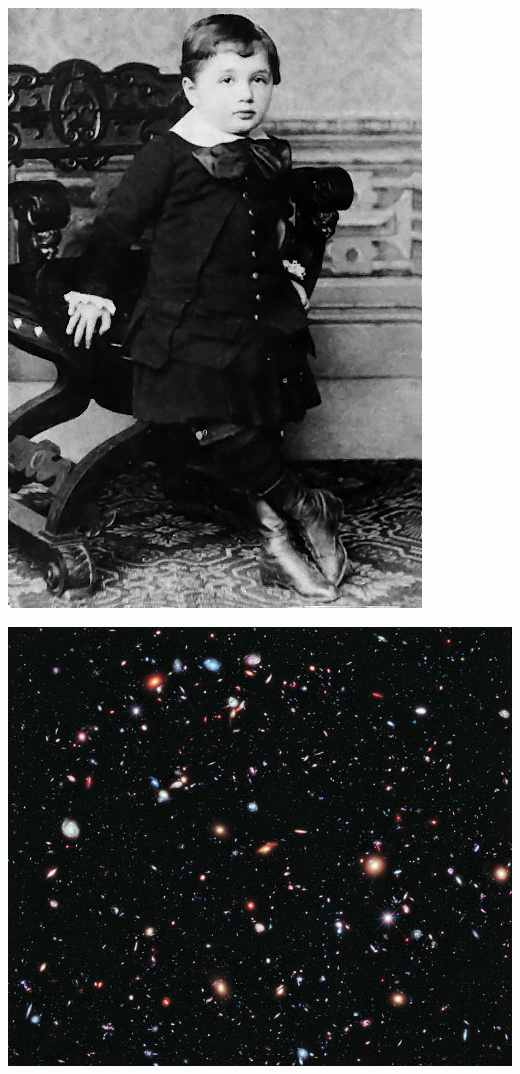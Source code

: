 \begin{center}
\begin{minipage}{0.24\textwidth}
\includegraphics[width=\textwidth]{images/Albert_Einstein_at_the_age_of_three_(1882)}
\end{minipage}
\begin{minipage}{0.4\textwidth}  
\includegraphics[width=\textwidth]{images/The_Hubble_eXtreme_Deep_Field}

\end{minipage}
\end{center}
